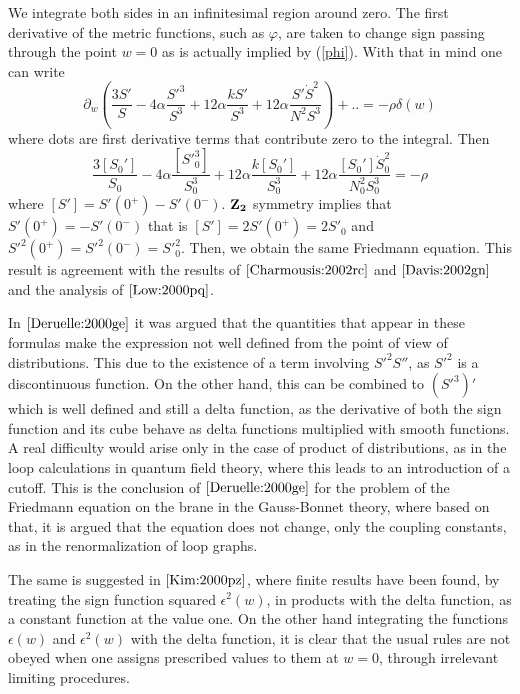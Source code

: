 \documentclass[a4paper,a4paper]{article}
\begin{document}
We integrate both sides
in an infinitesimal region around zero. The first derivative of the metric functions, such as
$\varphi$, are taken to change sign passing through the point $w=0$ as is actually implied by
(\ref{phi}). With that in mind one can write
\begin{equation}
\partial_w \left(\frac{3S'}{S}- 4 \alpha \frac{  {S'}^3}{S^3}
 +   12 \alpha \frac{ k S'}{S^3}
+ 12 \alpha \frac{S' \dot S^2}{N^2S^3} \right)+..=- \rho \delta(w)
\end{equation}
where dots are first derivative terms that contribute zero to the integral. Then
\begin{equation} \label{dis}
\frac{3[S_0']}{S_0}- 4 \alpha \frac{  [{S'}_0^3]}{S_0^3}+
 12 \alpha  \frac{ k [S_0']}{S^3_0}+ 12 \alpha \frac{ [S_0'] \dot S_0^2}{N_0^2S_0^3}=-\rho
\end{equation}
where  $[S']=S'(0^+)-S'(0^-)$. $\bf Z_2$ symmetry 
implies that $S'(0^+)=-S'(0^-)$ 
that is $[S']=2S'(0^+)=2S'_0$ and
${S'}^2(0^+)={S'}^2(0^-)={S'}^2_0$. Then, we obtain the same Friedmann equation. This result is
agreement with the results of $\cite{Charmousis:2002rc}$ 
and $\cite{Davis:2002gn}$ and the analysis of $\cite{Low:2000pq}$.

In $\cite{Deruelle:2000ge}$ it was argued that the quantities that appear in these formulas
make the expression not well defined from the point of view of distributions. This due to 
the existence of a term involving ${S'}^2 S''$, as ${S'}^2$ is a discontinuous function. On the
other hand, this can be combined to $({S'}^3)'$ which is well defined and
still a delta function, as the derivative of both the sign function and its cube behave as
delta functions multiplied with smooth functions. A real difficulty would arise only 
in the case of product of distributions, as in the loop calculations in quantum field theory,
where this leads to an introduction of a cutoff. This is the conclusion of $\cite{Deruelle:2000ge}$
for the problem of the Friedmann equation on the brane in the Gauss-Bonnet theory, where
based on that, it is argued that the equation does not change, only the coupling constants, as
in the renormalization of loop graphs.

 The same is suggested in $\cite{Kim:2000pz}$, where
finite results have been found, by treating the sign function squared $\epsilon^2(w)$, in products
with the delta function, as a constant function at the value one. On the other hand 
integrating the functions $\epsilon(w)$ and $\epsilon^2(w)$ with the delta function, it is clear that
the usual rules are not obeyed when one assigns prescribed values to them at $w=0$, through
irrelevant limiting procedures. 
\end{document}
